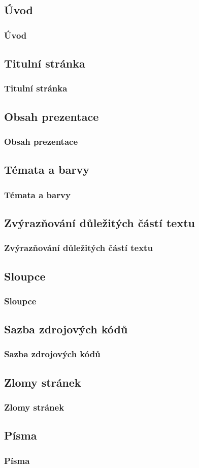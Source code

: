 \subsection{Úvod}
\begin{frame}
	\frametitle{Úvod}
\end{frame}


\subsection{Titulní stránka}
\begin{frame}
	\frametitle{Titulní stránka}
\end{frame}


\subsection{Obsah prezentace}
\begin{frame}
	\frametitle{Obsah prezentace}
\end{frame}


\subsection{Témata a barvy}
\begin{frame}
	\frametitle{Témata a barvy}
\end{frame}


\subsection{Zvýrazňování důležitých částí textu}
\begin{frame}
	\frametitle{Zvýrazňování důležitých částí textu}
\end{frame}


\subsection{Sloupce}
\begin{frame}
	\frametitle{Sloupce}
\end{frame}


\subsection{Sazba zdrojových kódů}
\begin{frame}
	\frametitle{Sazba zdrojových kódů}
\end{frame}


\subsection{Zlomy stránek}
\begin{frame}
	\frametitle{Zlomy stránek}
\end{frame}


\subsection{Písma}
\begin{frame}
	\frametitle{Písma}
\end{frame}

\endinput
